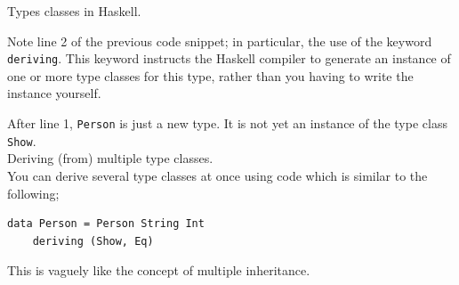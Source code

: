 \begin{frame}[t, fragile]{Types classes in Haskell.}

Note line 2 of the previous code snippet; in particular, the use of the keyword \texttt{deriving}.
This keyword instructs the Haskell compiler to generate an instance of one or more type classes for this type, rather
than you having to write the instance yourself.

After line 1, \texttt{Person} is just a new type. It is not yet an instance of the
type class \texttt{Show}. \\

\textbullet{} Deriving (from) multiple type classes. \\

You can derive several type classes at once using code which is similar to the following;

\begin{verbatim}
data Person = Person String Int
    deriving (Show, Eq)
\end{verbatim}

This is vaguely like the concept of multiple inheritance.
\end{frame}

